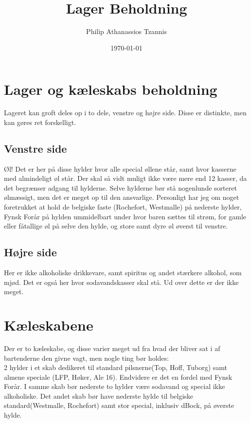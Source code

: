 

\title{Lager Beholdning}
\author{Philip Athanassios Tzannis}
\date{\today}



\maketitle

\section{Lager og kæleskabs beholdning}
Lageret kan groft deles op i to dele, venstre og højre side. Disse er distinkte, men kan gøres ret forskelligt.
\subsection{Venstre side}
Øl! Det er her på disse hylder hvor alle special øllene står, samt hvor kasserne med almindeligt øl står. Der skal så vidt muligt ikke være mere end 12 kasser, da det begrænser adgang til hylderne. Selve hylderne bør stå nogenlunde sorteret ølmæssigt, men det er meget op til den ansvarlige. Personligt har jeg om noget foretrukket at hold de belgiske faste (Rochefort, Westmalle) på nederste hylder, Fynsk Forår på hylden ummidelbart under hvor baren sættes til strøm, for gamle eller fåtallige øl på selve den hylde, og store samt dyre øl øverst til venstre.
\subsection{Højre side}
Her er ikke alkoholiske drikkevare, samt spiritus og andet stærkere alkohol, som mjød. Det er også her hvor sodavandskasser skal stå. Ud over dette er der ikke meget.

\section{Kæleskabene}
Der er to kæleskabe, og disse varier meget ud fra hvad der bliver sat i af bartenderne den givne vagt, men nogle ting bør holdes:\\
2 hylder i et skab dedikeret til standard pilsnerne(Top, Hoff, Tuborg) samt almene speciale (LFP, Høker, Ale 16). Endvidere er det en fordel med Fynsk Forår. I samme skab bør nederste to hylder være sodavand og special ikke alkoholiske. Det andet skab bør have nederste hylde til belgiske standard(Westmalle, Rochefort) samt stor special, inklusiv dBock, på øverste hylde.


